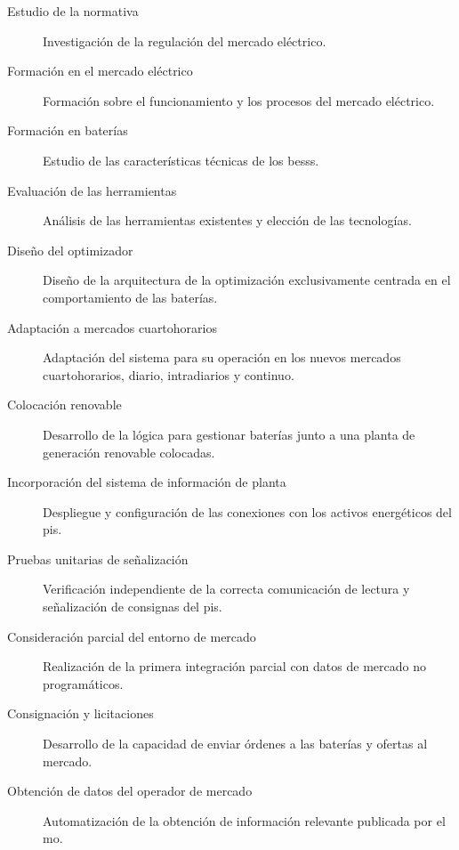 \begin{description}

  \item[Estudio de la normativa] Investigación de la regulación del mercado eléctrico.

  \item[Formación en el mercado eléctrico] Formación sobre el funcionamiento y los procesos del mercado eléctrico.

  \item[Formación en baterías] Estudio de las características técnicas de los \glspl{bess}.

  \item[Evaluación de las herramientas] Análisis de las herramientas existentes y elección de las tecnologías.

  \item[Diseño del optimizador] Diseño de la arquitectura de la optimización exclusivamente centrada en el comportamiento de las baterías.

  \item[Adaptación a mercados cuartohorarios] Adaptación del sistema para su operación en los nuevos mercados cuartohorarios, diario, intradiarios y continuo.

  \item[Colocación renovable] Desarrollo de la lógica para gestionar baterías junto a una planta de generación renovable colocadas.

  \item[Incorporación del sistema de información de planta] Despliegue y configuración de las conexiones con los activos energéticos del \gls{pis}.

  \item[Pruebas unitarias de señalización] Verificación independiente de la correcta comunicación de lectura y señalización de consignas del \gls{pis}.

  \item[Consideración parcial del entorno de mercado] Realización de la primera integración parcial con datos de mercado no programáticos.

  \item[Consignación y licitaciones] Desarrollo de la capacidad de enviar órdenes a las baterías y ofertas al mercado.

  \item[Obtención de datos del operador de mercado] Automatización de la obtención de información relevante publicada por el \gls{mo}.


\end{description}
